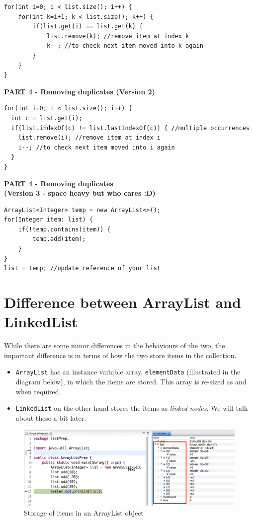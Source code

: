 \begin{lstlisting}
for(int i=0; i < list.size(); i++) {
	for(int k=i+1; k < list.size(); k++) {
		if(list.get(i) == list.get(k) {
			list.remove(k); //remove item at index k
			k--; //to check next item moved into k again
		}
	}
}
\end{lstlisting}

\begin{center}
\textbf{PART 4 - Removing duplicates (Version 2)}	
\end{center}

\begin{lstlisting}
for(int i=0; i < list.size(); i++) {
  int c = list.get(i);
  if(list.indexOf(c) != list.lastIndexOf(c)) { //multiple occurrences
	list.remove(i); //remove item at index i
	i--; //to check next item moved into i again
  }
}
\end{lstlisting}

\begin{center}
\textbf{PART 4 - Removing duplicates \\ (Version 3 - space heavy but who cares :D)}	
\end{center}

\begin{lstlisting}
ArrayList<Integer> temp = new ArrayList<>();
for(Integer item: list) {
	if(!temp.contains(item)) {
		temp.add(item);
  	}
}
list = temp; //update reference of your list
\end{lstlisting}

\section{Difference between ArrayList and LinkedList}

While there are some minor differences in the behaviours of the two, the important difference is in terms of how the two store items in the collection.

\begin{itemize}
  \item \texttt{ArrayList} has an instance variable array, \texttt{elementData} (illustrated in the diagram below), in which the items are stored. This array is re-sized as and when required. 
  
\item \texttt{LinkedList} on the other hand stores the items as \emph{linked nodes}. We will talk about these a bit later.
\end{itemize}

\begin{figure}[h!]
  \caption{Storage of items in an ArrayList object}
  \includegraphics[scale=0.4]{images/elementData}
\end{figure}

